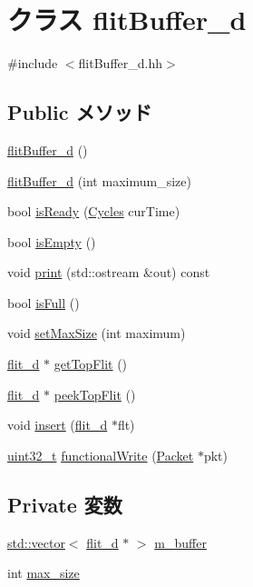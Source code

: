 \hypertarget{classflitBuffer__d}{
\section{クラス flitBuffer\_\-d}
\label{classflitBuffer__d}
}


{\ttfamily \#include $<$flitBuffer\_\-d.hh$>$}\subsection*{Public メソッド}
\begin{DoxyCompactItemize}
\item 
\hyperlink{classflitBuffer__d_aec002f999eebe139ec46bd4642d12650}{flitBuffer\_\-d} ()
\item 
\hyperlink{classflitBuffer__d_a238ead513351dcf50c43b7a14ed25733}{flitBuffer\_\-d} (int maximum\_\-size)
\item 
bool \hyperlink{classflitBuffer__d_ae19b07af91a49435139ba13f5665b239}{isReady} (\hyperlink{classCycles}{Cycles} curTime)
\item 
bool \hyperlink{classflitBuffer__d_af337ffd75e4f019ce15302c60715d84b}{isEmpty} ()
\item 
void \hyperlink{classflitBuffer__d_ac55fe386a101fbae38c716067c9966a0}{print} (std::ostream \&out) const 
\item 
bool \hyperlink{classflitBuffer__d_a3e70330939fdfc4dbc2f60c1a660584d}{isFull} ()
\item 
void \hyperlink{classflitBuffer__d_ac58f3102de0ff8d654c9dbdf86c82b2a}{setMaxSize} (int maximum)
\item 
\hyperlink{classflit__d}{flit\_\-d} $\ast$ \hyperlink{classflitBuffer__d_a5b9261af9ccdd053e2311fb749c88fa6}{getTopFlit} ()
\item 
\hyperlink{classflit__d}{flit\_\-d} $\ast$ \hyperlink{classflitBuffer__d_ad04b660f0ff7b0e397beb261633f8b4e}{peekTopFlit} ()
\item 
void \hyperlink{classflitBuffer__d_aaf9d98f29475b88e50b24a96f47f8dc1}{insert} (\hyperlink{classflit__d}{flit\_\-d} $\ast$flt)
\item 
\hyperlink{Type_8hh_a435d1572bf3f880d55459d9805097f62}{uint32\_\-t} \hyperlink{classflitBuffer__d_ad07b9def1d6f5e5f988a254c3a9d1ad9}{functionalWrite} (\hyperlink{classPacket}{Packet} $\ast$pkt)
\end{DoxyCompactItemize}
\subsection*{Private 変数}
\begin{DoxyCompactItemize}
\item 
\hyperlink{classstd_1_1vector}{std::vector}$<$ \hyperlink{classflit__d}{flit\_\-d} $\ast$ $>$ \hyperlink{classflitBuffer__d_a3c68626af928c9b911d8912770606f2e}{m\_\-buffer}
\item 
int \hyperlink{classflitBuffer__d_a98ca8117bc73d9d7520727c4ce8772e6}{max\_\-size}
\end{DoxyCompactItemize}


